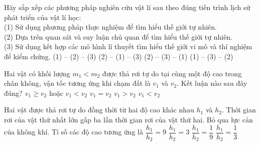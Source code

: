 \begin{ex}
	Hãy sắp xếp các phương pháp nghiên cứu vật lí sau theo đúng tiến trình lịch sử phát triển của vật lí học:\\ (1) Sử dụng phương pháp thực nghiệm để tìm hiểu thế giới tự nhiên.\\ (2) Dựa trên quan sát và suy luận chủ quan để tìm hiểu thế giới tự nhiên.\\ (3) Sử dụng kết hợp các mô hình lí thuyết tìm hiểu thế giới vi mô và thí nghiệm để kiểm chứng.
	\choice
	{(1) -- (2) -- (3)}
	{\True (2) -- (1) -- (3)}
	{(2) -- (3) -- (1)}
	{(1) -- (3) -- (2)}
\end{ex}

\begin{ex}
	Hai vật có khối lượng $m_1 < m_2$ được thả rơi tự do tại cùng một độ cao trong chân không, vận tốc tương ứng khi chạm đất là $v_1$ và $v_2$. Kết luận nào sau đây đúng?
	\choice
	{$v_1 \ge v_2$ hoặc $v_1 < v_2$}
	{\True $v_1 = v_2$}
	{$v_1 > v_2$}
	{$v_1 < v_2$}
\end{ex}

\begin{ex}
	Hai vật được thả rơi tự do đồng thời từ hai độ cao khác nhau $h_1$ và $h_2$. Thời gian rơi của vật thứ nhất lớn gấp ba lần thời gian rơi của vật thứ hai. Bỏ qua lực cản của không khí. Tỉ số các độ cao tương ứng là
	\choice
	{\True $\dfrac{h_1}{h_2} = 9$}
	{$\dfrac{h_1}{h_2} = 3$}
	{$\dfrac{h_1}{h_2} = \dfrac{1}{9}$}
	{$\dfrac{h_1}{h_2} = \dfrac{1}{3}$}
\end{ex}

